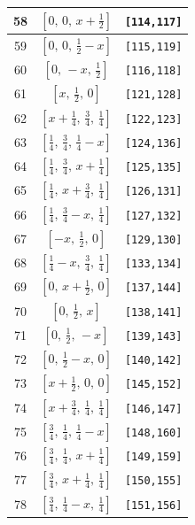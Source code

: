 \documentclass[fleqn,8pt]{jsarticle}
\begin{document}
\begin{longtable}{ccc}
58 & $\left[ 0,\, 0,\, x + \frac{1}{2} \right]$ & {\tt [114,117]} \\ \hline
59 & $\left[ 0,\, 0,\, \frac{1}{2} - x \right]$ & {\tt [115,119]} \\ \hline
60 & $\left[ 0,\, - x,\, \frac{1}{2} \right]$ & {\tt [116,118]} \\ \hline
61 & $\left[ x,\, \frac{1}{2},\, 0 \right]$ & {\tt [121,128]} \\ \hline
62 & $\left[ x + \frac{1}{4},\, \frac{3}{4},\, \frac{1}{4} \right]$ & {\tt [122,123]} \\ \hline
63 & $\left[ \frac{1}{4},\, \frac{3}{4},\, \frac{1}{4} - x \right]$ & {\tt [124,136]} \\ \hline
64 & $\left[ \frac{1}{4},\, \frac{3}{4},\, x + \frac{1}{4} \right]$ & {\tt [125,135]} \\ \hline
65 & $\left[ \frac{1}{4},\, x + \frac{3}{4},\, \frac{1}{4} \right]$ & {\tt [126,131]} \\ \hline
66 & $\left[ \frac{1}{4},\, \frac{3}{4} - x,\, \frac{1}{4} \right]$ & {\tt [127,132]} \\ \hline
67 & $\left[ - x,\, \frac{1}{2},\, 0 \right]$ & {\tt [129,130]} \\ \hline
68 & $\left[ \frac{1}{4} - x,\, \frac{3}{4},\, \frac{1}{4} \right]$ & {\tt [133,134]} \\ \hline
69 & $\left[ 0,\, x + \frac{1}{2},\, 0 \right]$ & {\tt [137,144]} \\ \hline
70 & $\left[ 0,\, \frac{1}{2},\, x \right]$ & {\tt [138,141]} \\ \hline
71 & $\left[ 0,\, \frac{1}{2},\, - x \right]$ & {\tt [139,143]} \\ \hline
72 & $\left[ 0,\, \frac{1}{2} - x,\, 0 \right]$ & {\tt [140,142]} \\ \hline
73 & $\left[ x + \frac{1}{2},\, 0,\, 0 \right]$ & {\tt [145,152]} \\ \hline
74 & $\left[ x + \frac{3}{4},\, \frac{1}{4},\, \frac{1}{4} \right]$ & {\tt [146,147]} \\ \hline
75 & $\left[ \frac{3}{4},\, \frac{1}{4},\, \frac{1}{4} - x \right]$ & {\tt [148,160]} \\ \hline
76 & $\left[ \frac{3}{4},\, \frac{1}{4},\, x + \frac{1}{4} \right]$ & {\tt [149,159]} \\ \hline
77 & $\left[ \frac{3}{4},\, x + \frac{1}{4},\, \frac{1}{4} \right]$ & {\tt [150,155]} \\ \hline
78 & $\left[ \frac{3}{4},\, \frac{1}{4} - x,\, \frac{1}{4} \right]$ & {\tt [151,156]} \\ \hline

\end{longtable}
\end{document}
